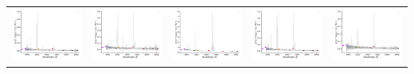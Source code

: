 \begin{center}
\begin{longtable}{l l l l l }
    \includegraphics[width=0.19\linewidth, clip]{Figs/Figs-sdss/spec-1494-52937-0249-STRIPE82-0013-010873.pdf} & \includegraphics[width=0.19\linewidth, clip]{Figs/Figs-sdss/spec-1509-52942-0633-STRIPE82-0058-020465.pdf} & \includegraphics[width=0.19\linewidth, clip]{Figs/Figs-sdss/spec-1511-52946-0192-STRIPE82-0059-038994.pdf} & \includegraphics[width=0.19\linewidth, clip]{Figs/Figs-sdss/spec-1512-53742-0281-STRIPE82-0061-012261.pdf} & \includegraphics[width=0.19\linewidth, clip]{Figs/Figs-sdss/spec-1512-53742-0296-STRIPE82-0061-011773.pdf} \\

\end{longtable}
\end{center}
